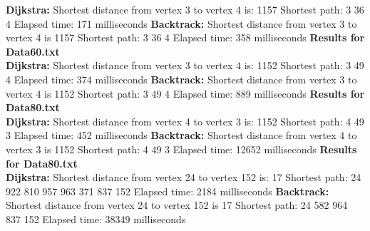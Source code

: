 \documentclass{article}
\begin{document}
\textbf{Dijkstra:\newline}
Shortest distance from vertex 3 to vertex 4 is: 1157\newline
Shortest path: 3 36 4 \newline
Elapsed time: 171 milliseconds\newline
\textbf{Backtrack:\newline}
Shortest distance from vertex 3 to vertex 4 is 1157\newline
Shortest path: 3 36 4\newline
Elapsed time: 358 milliseconds\newline
\newline
\textbf{Results for Data60.txt\\}
\textbf{Dijkstra:\newline}
Shortest distance from vertex 3 to vertex 4 is: 1152\newline
Shortest path: 3 49 4 \newline
Elapsed time: 374 milliseconds\newline
\textbf{Backtrack:\newline}
Shortest distance from vertex 3 to vertex 4 is 1152\newline
Shortest path: 3 49 4\newline
Elapsed time: 889 milliseconds\newline
\newline
\textbf{Results for Data80.txt\\}
\textbf{Dijkstra:\newline}
Shortest distance from vertex 4 to vertex 3 is: 1152\newline
Shortest path: 4 49 3 \newline
Elapsed time: 452 milliseconds\newline
\textbf{Backtrack:\newline}
Shortest distance from vertex 4 to vertex 3 is 1152\newline
Shortest path: 4 49 3\newline
Elapsed time: 12652 milliseconds\newline
\newline
\textbf{Results for Data80.txt\\}
\textbf{Dijkstra:\newline}
Shortest distance from vertex 24 to vertex 152 is: 17\newline
Shortest path: 24 922 810 957 963 371 837 152 \newline
Elapsed time: 2184 milliseconds\newline
\textbf{Backtrack:\newline}
Shortest distance from vertex 24 to vertex 152 is 17\newline
Shortest path: 24 582 964 837 152\newline
Elapsed time: 38349 milliseconds\newline
\end{document}

